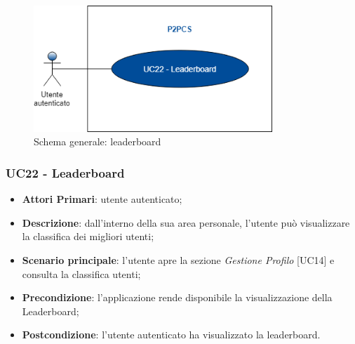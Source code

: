 \begin{figure}[h]
	\includegraphics[width=9cm]{res/images/UC22Leaderboard.png}
	\centering
	\caption{Schema generale: leaderboard}
\end{figure}
\subsubsection{UC22 - Leaderboard}
\begin{itemize}
	\item \textbf{Attori Primari}: utente autenticato;
	\item \textbf{Descrizione}: dall'interno della sua area personale, l'utente può visualizzare la classifica dei migliori utenti;
	\item \textbf{Scenario principale}: l'utente apre la sezione \textit{Gestione Profilo} [UC14] e consulta la classifica utenti;
	\item \textbf{Precondizione}: l'applicazione rende disponibile la visualizzazione della Leaderboard\glosp;
	\item \textbf{Postcondizione}: l'utente autenticato ha visualizzato la leaderboard.
\end{itemize}

